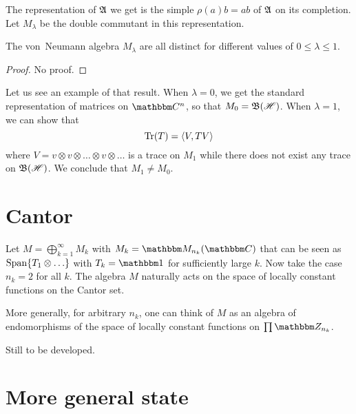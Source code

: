 The representation of $\mathfrak{A}$ we get is the simple $\rho(a)b=ab$ of $\mathfrak{A}$ on its completion. Let $M_{\lambda}$ be the double commutant in this representation. 

\begin{theorem}[Powers]
The von~Neumann algebra $M_{\lambda}$ are all distinct for different values of $0\leq\lambda\leq 1$.
\end{theorem}
\begin{proof}
No proof.
\end{proof}

Let us see an example of that result. When $\lambda=0$, we get the standard representation of matrices on $\eC^n$, so that $M_0=\mathfrak{B}(\mathscr{H})$. When $\lambda=1$, we can show that 
\[ 
  \operatorname{Tr}(T)=\langle V, TV\rangle 
\]
where $V=v\otimes v\otimes\ldots\otimes v\otimes\ldots$ is a trace on $M_1$ while there does not exist any trace on $\mathfrak{B}(\mathscr{H})$. We conclude that $M_1\neq M_0$.

\section{Cantor}

Let $M=\bigoplus_{k=1}^{\infty}M_k$ with $M_k=\eM_{n_k}(\eC)$ that can be seen as $\operatorname{Span}\{ T_1\otimes\ldots \}$ with $T_k=\mtu$ for sufficiently large $k$. Now take the case $n_k=2$ for all $k$. The algebra $M$ naturally acts on the space of locally constant functions on the Cantor set.

More generally, for arbitrary $n_k$, one can think of $M$ as an algebra of endomorphisms of the space of locally constant functions on $\prod\eZ_{n_k}$.
\begin{probleme}
Still to be developed.
\end{probleme}

					\section{More general state}

